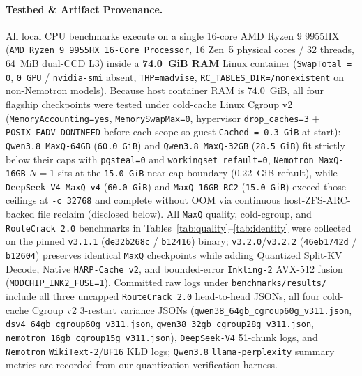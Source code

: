 \documentclass[10pt,twocolumn]{article}
\begin{document}
\paragraph{Testbed \& Artifact Provenance.}
All local CPU benchmarks execute on a single 16-core AMD Ryzen 9 9955HX (\texttt{AMD Ryzen 9 9955HX 16-Core Processor}, 16 Zen~5 physical cores / 32 threads, 64~MiB dual-CCD L3) inside a \textbf{74.0~GiB RAM} Linux container (\texttt{SwapTotal = 0}, \texttt{0 GPU} / \texttt{nvidia-smi} absent, \texttt{THP=madvise}, \texttt{RC\_TABLES\_DIR=/nonexistent} on non-Nemotron models). Because host container RAM is 74.0~GiB, all four flagship checkpoints were tested under cold-cache Linux Cgroup v2 (\texttt{MemoryAccounting=yes}, \texttt{MemorySwapMax=0}, hypervisor \texttt{drop\_caches=3} + \texttt{POSIX\_FADV\_DONTNEED} before each scope so guest \texttt{Cached = 0.3~GiB} at start): \texttt{Qwen3.8 MaxQ-64GB} (\texttt{60.0~GiB}) and \texttt{Qwen3.8 MaxQ-32GB} (\texttt{28.5~GiB}) fit strictly below their caps with \texttt{pgsteal=0} and \texttt{workingset\_refault=0}, \texttt{Nemotron MaxQ-16GB} $N=1$ sits at the \texttt{15.0~GiB} near-cap boundary (0.22~GiB refault), while \texttt{DeepSeek-V4 MaxQ-v4} (\texttt{60.0~GiB}) and \texttt{MaxQ-16GB RC2} (\texttt{15.0~GiB}) exceed those ceilings at \texttt{-c 32768} and complete without OOM via continuous host-ZFS-ARC-backed file reclaim (disclosed below). All \texttt{MaxQ} quality, cold-cgroup, and \texttt{RouteCrack 2.0} benchmarks in Tables~\ref{tab:quality}--\ref{tab:identity} were collected on the pinned \texttt{v3.1.1} (\texttt{de32b268c} / \texttt{b12416}) binary; \texttt{v3.2.0}/\texttt{v3.2.2} (\texttt{46eb1742d} / \texttt{b12604}) preserves identical \texttt{MaxQ} checkpoints while adding Quantized Split-KV Decode, Native \texttt{HARP-Cache v2}, and bounded-error \texttt{Inkling-2} AVX-512 fusion (\texttt{MODCHIP\_INK2\_FUSE=1}). Committed raw logs under \texttt{benchmarks/results/} include all three uncapped \texttt{RouteCrack 2.0} head-to-head JSONs, all four cold-cache Cgroup v2 3-restart variance JSONs (\texttt{qwen38\_64gb\_cgroup60g\_v311.json}, \texttt{dsv4\_64gb\_cgroup60g\_v311.json}, \texttt{qwen38\_32gb\_cgroup28g\_v311.json}, \texttt{nemotron\_16gb\_cgroup15g\_v311.json}), \texttt{DeepSeek-V4} 51-chunk logs, and \texttt{Nemotron} \texttt{WikiText-2}/\texttt{BF16} KLD logs; \texttt{Qwen3.8} \texttt{llama-perplexity} summary metrics are recorded from our quantization verification harness.
\end{document}
